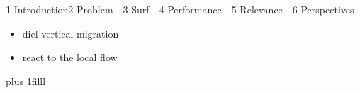 \begin{frame}{1 Introduction}{2 Problem - 3 Surf - 4 Performance - 5 Relevance - 6 Perspectives}
	\centering
	\vspace{0pt}
	\begin{multicols}{2}
		\begin{itemize}
			\large
			\setlength\itemsep{4pt}
			\item <1-> diel vertical migration
			\item <2-> react to the local flow
		\end{itemize}
	\end{multicols}

	\vspace{6pt}
	\begin{figure}
	\end{figure}

	\vskip0pt plus 1filll

	\pause
	\vspace{-5pt}
	\vspace{15pt}
\end{frame}


